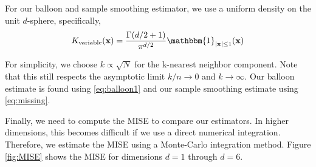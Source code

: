 \documentclass{article}
\begin{document}
For our balloon and sample smoothing estimator, we use a uniform density on the unit $d$-sphere, specifically,
\begin{equation}
    K_{\textup{variable}}(\mathbf{x}) = \frac{\Gamma(d/2+1)}{\pi^{d/2}}\mathbbm{1}_{\vert\mathbf{x}\vert\leq1}(\mathbf{x})
\end{equation}

For simplicity, we choose $k \propto \sqrt{N}$ for the k-nearest neighbor component. Note that this still respects the asymptotic limit $k/n \rightarrow 0$ and $k\rightarrow \infty$. Our balloon estimate is found using \eqref{eq:balloon1} and our sample smoothing estimate using \eqref{eq:missing}.

Finally, we need to compute the MISE to compare our estimators. In higher dimensions, this becomes difficult if we use a direct numerical integration. Therefore, we estimate the MISE using a Monte-Carlo integration method. Figure \ref{fig:MISE} shows the MISE for dimensions $d=1$ through $d=6$.
\end{document}
